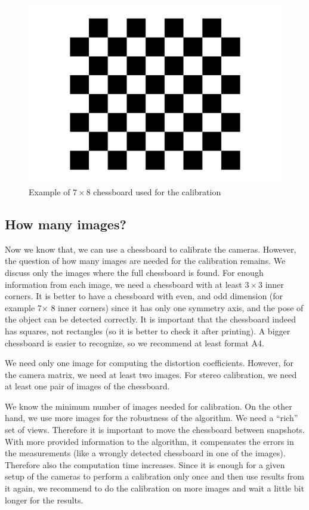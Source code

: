 \begin{figure}
	\centering
	\includegraphics[width=0.8\linewidth]{img/chessboard/7x8chessboard}
	\caption{Example of $7\times8$ chessboard used for the calibration}
	\label{fig:chessboard}
\end{figure}

\subsection{How many images?} 

Now we know that, we can use a chessboard to calibrate the cameras. However,
the question of how many images are needed for the calibration remains. We
discuss only the images where the full chessboard is found. For enough
information from each image, we need a chessboard with at least $3\times3$
inner corners. It is better to have a chessboard with even, and odd dimension
(for example 7$\times$ 8 inner corners) since it has only one symmetry axis,
and the pose of the object can be detected correctly. It is important that the
chessboard indeed has squares, not rectangles (so it is better to check it
after printing). A bigger chessboard is easier to recognize, so we recommend at
least format A4.

We need only one image for computing the distortion coefficients. However, for
the camera matrix, we need at least two images. For stereo calibration, we need at
least one pair of images of the chessboard.

We know the minimum number of images needed for calibration. On the other hand,
we use more images for the robustness of the algorithm. We need a ``rich'' set of
views. Therefore it is important to move the chessboard between snapshots. With
more provided information to the algorithm, it compensates the errors in the
measurements (like a wrongly detected chessboard in one of the images).
Therefore also the computation time increases. Since it is enough for a given
setup of the cameras to perform a calibration only once and then use results
from it again, we recommend to do the calibration on more images and wait a
little bit longer for the results. 
